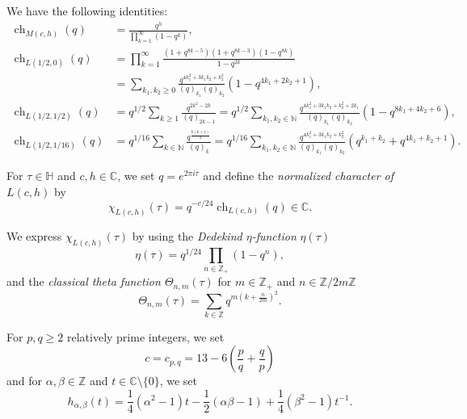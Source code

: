 \documentclass{beamer}
\DeclareMathOperator{\ch}{ch}
\begin{document}
\begin{frame}
  \begin{theorem}
    We have the following identities:
    \footnotesize
    \begin{align*}
      \ch_{M(c, h)}(q) &= \frac{q^h}{\prod_{k = 1}^{\infty}(1 - q^k)}, \\
      \ch_{L(1/2, 0)}(q) &= \prod_{k = 1}^{\infty}\frac{(1 + q^{8k - 5})(1 + q^{8k - 3})(1 - q^{8k})}{1 - q^{2k}} \\
                       &= \sum_{k_1, k_2 \ge 0}\frac{q^{4k_1^2 + 3k_1k_2 + k_2^2}}{(q)_{k_1}(q)_{k_2}}(1 - q^{4k_1 + 2k_2 + 1}), \\
      \ch_{L(1/2, 1/2)}(q) &= q^{1/2}\sum_{k \ge 1}\frac{q^{2k^2 - 2k}}{(q)_{2k - 1}} = q^{1/2}\sum_{k_1, k_2 \in \mathbb{N}}\frac{q^{4k_1^2 + 3k_1k_2 + k_2^2 + 2k_1}}{(q)_{k_1}(q)_{k_2}}(1 - q^{8k_1 + 4k_2 + 6}), \\
      \ch_{L(1/2, 1/16)}(q) &= q^{1/16}\sum_{k \in \mathbb{N}}\frac{q^{\frac{k(k + 1)}{2}}}{(q)_k} = q^{1/16}\sum_{k_1, k_2 \in \mathbb{N}}\frac{q^{4k_1^2 + 3k_1k_2 + k_2^2}}{(q)_{k_1}(q)_{k_2}}(q^{k_1 + k_2} + q^{4k_1 + k_2 + 1}).
    \end{align*}
  \end{theorem}
\end{frame}

\begin{frame}
  For $\tau \in \mathbb{H}$ and $c, h \in \mathbb{C}$, we set $q = e^{2\pi i\tau}$ and define the \emph{normalized character of $L(c, h)$} by
  \begin{equation*}
    \chi_{L(c, h)}(\tau) = q^{-c/24}\ch_{L(c, h)}(q) \in \mathbb{C}.
  \end{equation*}

  We express $\chi_{L(c, h)}(\tau)$ by using the \emph{Dedekind $\eta$-function} $\eta(\tau)$
  \begin{equation*}
    \eta(\tau) = q^{1/24}\prod_{n \in \mathbb{Z}_+}(1 - q^n),
  \end{equation*}
  and the \emph{classical theta function $\Theta_{n, m}(\tau)$} for $m \in \mathbb{Z}_+$ and $n \in \mathbb{Z}/2m\mathbb{Z}$
  \begin{equation*}
    \Theta_{n, m}(\tau) = \sum_{k \in \mathbb{Z}}q^{m(k + \frac{n}{2m})^2}.
  \end{equation*}

  For $p, q \ge 2$ relatively prime integers, we set
  \begin{equation*}
    c = c_{p, q} = 13 - 6\left(\frac{p}{q} + \frac{q}{p}\right)
  \end{equation*}
  and for $\alpha, \beta \in \mathbb{Z}$ and $t \in \mathbb{C} \setminus \{0\}$, we set
  \begin{equation*}
    h_{\alpha, \beta}(t) = \frac{1}{4}(\alpha^2 - 1)t - \frac{1}{2}(\alpha\beta - 1) + \frac{1}{4}(\beta^2-1)t^{-1}.
  \end{equation*}
\end{frame}
\end{document}
